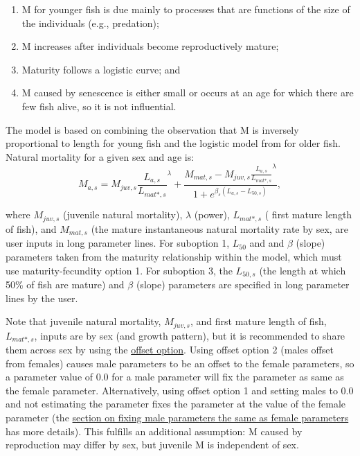 \begin{enumerate}
  \item M for younger fish is due mainly to processes that are functions of the size of the individuals (e.g., predation);
  \item M increases after individuals become reproductively mature;
  \item Maturity follows a logistic curve; and
  \item M caused by senescence is either small or occurs at an age for which there are few fish alive, so it is not influential. 
\end{enumerate}
The model is based on combining the observation that M is inversely proportional to length for young fish \citep{lorenzen2000allometry} and the logistic model from \citet{lehodey2008spatial} for older fish. Natural mortality for a given sex and age is:
\begin{equation}
M_{a,s} = M_{juv,s}\frac{L_{a,s}}{L_{mat*,s}}^{\lambda} + 
\frac{M_{mat,s}-M_{juv,s}\frac{L_{a,s}}{L_{mat*,s}}^{\lambda}}{1+e^{\beta_s(L_{a,s}- L_{50,s})}},
\end{equation}

where $M_{juv,s}$ (juvenile natural mortality), $\lambda$ (power), $L_{mat*,s}$ ( first mature length of fish), and $M_{mat,s}$ (the mature instantaneous natural mortality rate by sex, are user inputs in long parameter lines. For suboption 1, $L_{50}$ and and $\beta$ (slope) parameters taken from the maturity relationship within the model, which must use maturity-fecundity option 1. For suboption 3, the $L_{50,s}$ (the length at which 50\% of fish are mature) and $\beta$ (slope) parameters are specified in long parameter lines by the user.

Note that juvenile natural mortality, $M_{juv,s}$, and first mature length of fish, $L_{mat*,s}$, inputs are by sex (and growth pattern), but it is recommended to share them across sex by using the \hyperlink{offset}{offset option}. Using offset option 2 (males offset from females) causes male parameters to be an offset to the female parameters, so a parameter value of 0.0 for a male parameter will fix the parameter as same as the female parameter. Alternatively, using offset option 1 and setting males to 0.0 and not estimating the parameter fixes the parameter at the value of the female parameter (the \hyperlink{male-shortcut}{section on fixing male parameters the same as female parameters} has more details). This fulfills an additional assumption: M caused by reproduction may differ by sex, but juvenile M is independent of sex.

